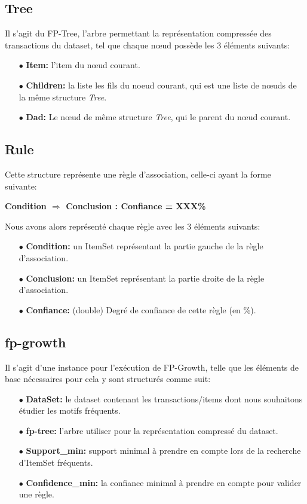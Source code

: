 \documentclass[12pt,a4paper,oneside]{book}
\begin{document}
	
	
	\subsection*{Tree}
	Il s'agit du FP-Tree, l'arbre permettant la représentation compressée des transactions du dataset, tel que chaque nœud possède les 3 éléments suivants:
	\begin{itemize}
		\item[$\bullet$] \textbf{Item:} l'item du nœud courant.
		\item[$\bullet$] \textbf{Children:} la liste les fils du noeud courant, qui est une liste de nœuds de la même structure \textit{Tree}.
		\item[$\bullet$] \textbf{Dad:} Le nœud de même structure \textit{Tree}, qui le parent du nœud courant. 
	\end{itemize}
	
	
	\subsection*{Rule}
	Cette structure représente une règle d'association,
	celle-ci ayant la forme suivante:
	\begin{center}
		\textbf{Condition $\Rightarrow$  Conclusion : Confiance = XXX\% }
	\end{center}
	Nous avons alors représenté chaque règle avec les 3 éléments suivants:
	\begin{itemize}
		\item[$\bullet$] \textbf{Condition:} un ItemSet représentant la partie gauche de la règle d'association.
		\item[$\bullet$] \textbf{Conclusion:} un ItemSet représentant la partie droite de la règle d'association.
		\item[$\bullet$] \textbf{Confiance:} (double) Degré de confiance de cette règle (en \%).
	\end{itemize}
	
	
	\subsection*{fp-growth}
	Il s'agit d'une instance pour l'exécution de FP-Growth, telle que les éléments de base nécessaires pour cela y sont structurés comme suit:
	\begin{itemize}
		\item[$\bullet$] \textbf{DataSet:} le dataset contenant les transactions/items dont nous souhaitons étudier les motifs fréquents.
		\item[$\bullet$] \textbf{fp-tree:} l'arbre utiliser pour la représentation compressé du dataset.
		\item[$\bullet$] \textbf{Support\_min:} support minimal à prendre en compte lors de la recherche d'ItemSet fréquents.
		\item[$\bullet$] \textbf{Confidence\_min:} la confiance minimal à prendre en compte pour valider une règle.
		
	\end{itemize}
	
\end{document}
